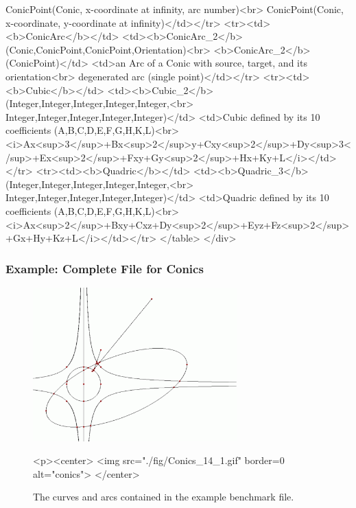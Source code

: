 \begin{ccHtmlOnly}
		           ConicPoint(Conic, x-coordinate at infinity, arc number)<br>
                           ConicPoint(Conic, x-coordinate, y-coordinate at infinity)</td></tr>
<tr><td><b>ConicArc</b></td>
    <td><b>ConicArc_2</b>(Conic,ConicPoint,ConicPoint,Orientation)<br>
        <b>ConicArc_2</b>(ConicPoint)</td>
    <td>an Arc of a Conic with source, target, and its orientation<br>
        degenerated arc (single point)</td></tr>
<tr><td><b>Cubic</b></td>
    <td><b>Cubic_2</b>(Integer,Integer,Integer,Integer,Integer,<br>
                       Integer,Integer,Integer,Integer,Integer)</td>
    <td>Cubic defined by its 10 coefficients (A,B,C,D,E,F,G,H,K,L)<br>
        <i>Ax<sup>3</sup>+Bx<sup>2</sup>y+Cxy<sup>2</sup>+Dy<sup>3</sup>+Ex<sup>2</sup>+Fxy+Gy<sup>2</sup>+Hx+Ky+L</i></td></tr>
<tr><td><b>Quadric</b></td>
    <td><b>Quadric_3</b>(Integer,Integer,Integer,Integer,Integer,<br>
                         Integer,Integer,Integer,Integer,Integer)</td>
    <td>Quadric defined by its 10 coefficients (A,B,C,D,E,F,G,H,K,L)<br>
        <i>Ax<sup>2</sup>+Bxy+Cxz+Dy<sup>2</sup>+Eyz+Fz<sup>2</sup>+Gx+Hy+Kz+L</i></td></tr>
</table>
</div>
\end{ccHtmlOnly}

\subsubsection {Example: Complete File for Conics}
\label{longexample}

\begin{figure}
\begin{ccTexOnly}
\centerline{\includegraphics[width=0.7\textwidth]{Benchmark/fig/Conics_14_1}}
\end{ccTexOnly}
\begin{ccHtmlOnly}
  <p><center>
  <img src="./fig/Conics_14_1.gif" border=0 alt="conics">
  </center>
\end{ccHtmlOnly}
\caption{The curves and arcs contained in the example benchmark file.
  \label{fig:example}}
\end{figure}

